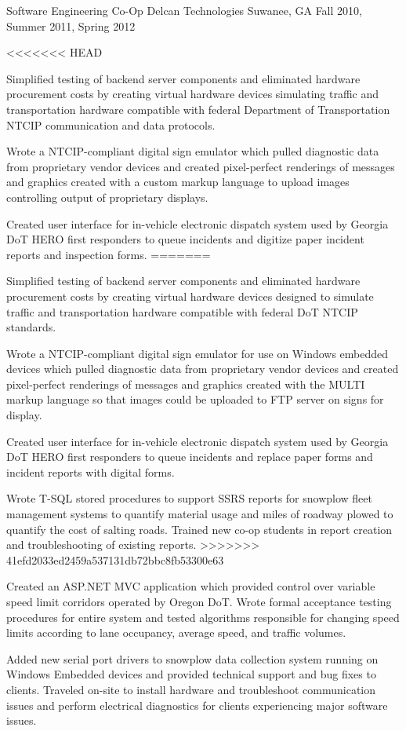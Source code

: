 \begin{cventries}
  \cventry
    {Software Engineering Co-Op} %
    {Delcan Technologies} %
    {Suwanee, GA} %
    {Fall 2010, Summer 2011, Spring 2012} %
    {
      \begin{cvitems} %
<<<<<<< HEAD
        \item {Simplified testing of backend server components and eliminated hardware procurement costs by creating virtual hardware devices simulating traffic and transportation hardware compatible with federal Department of Transportation NTCIP communication and data protocols.}
        \item {Wrote a NTCIP-compliant digital sign emulator which pulled diagnostic data from proprietary vendor devices and created pixel-perfect renderings of messages and graphics created with a custom markup language to upload images controlling output of proprietary displays.}
		\item {Created user interface for in-vehicle electronic dispatch system used by Georgia DoT HERO first responders to queue incidents and digitize paper incident reports and inspection forms.}
=======
        \item {Simplified testing of backend server components and eliminated hardware procurement costs by creating virtual hardware devices designed to simulate traffic and transportation hardware compatible with federal DoT NTCIP standards.}
        \item {Wrote a NTCIP-compliant digital sign emulator for use on Windows embedded devices which pulled diagnostic data from proprietary vendor devices and created pixel-perfect renderings of messages and graphics created with the MULTI markup language so that images could be uploaded to FTP server on signs for display.}
		\item {Created user interface for in-vehicle electronic dispatch system used by Georgia DoT HERO first responders to queue incidents and replace paper forms and incident reports with digital forms.}
		\item {Wrote T-SQL stored procedures to support SSRS reports for snowplow fleet management systems to quantify material usage and miles of roadway plowed to quantify the cost of salting roads. Trained new co-op students in report creation and troubleshooting of existing reports.}
>>>>>>> 41efd2033ed2459a537131db72bbc8fb53300e63
		\item {Created an ASP.NET MVC application which provided control over variable speed limit corridors operated by Oregon DoT. Wrote formal acceptance testing procedures for entire system and tested algorithms responsible for changing speed limits according to lane occupancy, average speed, and traffic volumes.}
		\item {Added new serial port drivers to snowplow data collection system running on Windows Embedded devices and provided technical support and bug fixes to clients. Traveled on-site to install hardware and troubleshoot communication issues and perform electrical diagnostics for clients experiencing major software issues.}
      \end{cvitems}
    }

\end{cventries}
